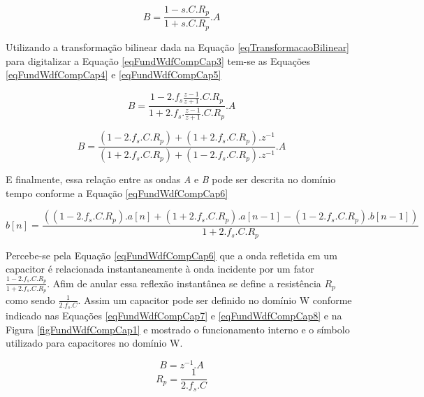 	\begin{equation}
		\label{eqFundWdfCompCap3}
		B = \frac{1-s.C.R_p}{1+s.C.R_p}.A
	\end{equation}
	
	Utilizando a transformação bilinear dada na Equação \ref{eqTransformacaoBilinear} para digitalizar a Equação \ref{eqFundWdfCompCap3} tem-se as Equações \ref{eqFundWdfCompCap4} e \ref{eqFundWdfCompCap5}
	
	
	\begin{equation}
		\label{eqFundWdfCompCap4}
		B = \frac{1-2.f_s\frac{z-1}{z+1}.C.R_p}{1+2.f_s.\frac{z-1}{z+1}.C.R_p}.A
	\end{equation} 
	
	\begin{equation}
		\label{eqFundWdfCompCap5}
		B = \frac{(1-2.f_s.C.R_p)+(1+2.f_s.C.R_p).z^{-1}}{(1+2.f_s.C.R_p)+(1-2.f_s.C.R_p).z^{-1}}.A
	\end{equation}
	
	E finalmente, essa relação entre as ondas \textit{A} e \textit{B} pode ser descrita no domínio tempo conforme a Equação \ref{eqFundWdfCompCap6}
	
	\begin{equation}
		\label{eqFundWdfCompCap6}
		b[n] = \frac{((1-2.f_s.C.R_p).a[n]+(1+2.f_s.C.R_p).a[n-1]-(1-2.f_s.C.R_p).b[n-1])}{1+2.f_s.C.R_p}	\end{equation}
	
	Percebe-se pela Equação \ref{eqFundWdfCompCap6} que a onda refletida em um capacitor é relacionada instantaneamente à onda incidente por um fator $\frac{1-2.f_s.C.R_p}{1+2.f_s.C.R_p}$. Afim de anular essa reflexão instantânea se define a resistência $R_p$ como sendo $\frac{1}{2.f_s.C}$. Assim um capacitor pode ser definido no domínio W conforme indicado nas Equações \ref{eqFundWdfCompCap7} e \ref{eqFundWdfCompCap8} e na Figura \ref{figFundWdfCompCap1} e mostrado o funcionamento interno e o símbolo utilizado para capacitores no domínio W.
	
	\begin{equation}
	\label{eqFundWdfCompCap7}
		B = z^{-1}.A
	\end{equation}
	\begin{equation}
	\label{eqFundWdfCompCap8}
		R_p = \frac{1}{2.f_s.C}
	\end{equation}
	
